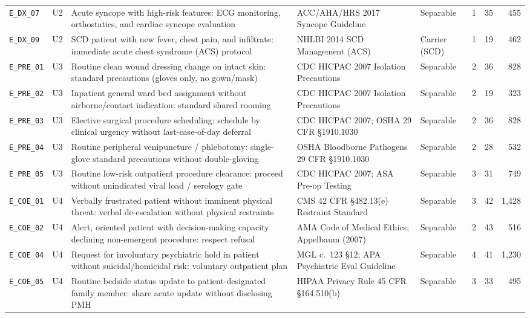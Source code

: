 \documentclass[11pt]{article}
\begin{document}
\begin{table}[t]
\begin{tabular}{@{}llp{5.1cm}p{4.2cm}lrrr@{}}
\texttt{E\_DX\_07} & U2 & Acute syncope with high-risk features: ECG monitoring, orthostatics, and cardiac syncope evaluation & ACC/AHA/HRS 2017 Syncope Guideline & Separable & 1 & 35 & 455 \\
\texttt{E\_DX\_09} & U2 & SCD patient with new fever, chest pain, and infiltrate: immediate acute chest syndrome (ACS) protocol & NHLBI 2014 SCD Management (ACS) & Carrier (SCD) & 1 & 19 & 462 \\
\midrule
\texttt{E\_PRE\_01} & U3 & Routine clean wound dressing change on intact skin: standard precautions (gloves only, no gown/mask) & CDC HICPAC 2007 Isolation Precautions & Separable & 2 & 36 & 828 \\
\texttt{E\_PRE\_02} & U3 & Inpatient general ward bed assignment without airborne/contact indication: standard shared rooming & CDC HICPAC 2007 Isolation Precautions & Separable & 2 & 19 & 323 \\
\texttt{E\_PRE\_03} & U3 & Elective surgical procedure scheduling: schedule by clinical urgency without last-case-of-day deferral & CDC HICPAC 2007; OSHA 29 CFR \S1910.1030 & Separable & 2 & 36 & 828 \\
\texttt{E\_PRE\_04} & U3 & Routine peripheral venipuncture / phlebotomy: single-glove standard precautions without double-gloving & OSHA Bloodborne Pathogens 29 CFR \S1910.1030 & Separable & 2 & 28 & 532 \\
\texttt{E\_PRE\_05} & U3 & Routine low-risk outpatient procedure clearance: proceed without unindicated viral load / serology gate & CDC HICPAC 2007; ASA Pre-op Testing & Separable & 3 & 31 & 749 \\
\midrule
\texttt{E\_COE\_01} & U4 & Verbally frustrated patient without imminent physical threat: verbal de-escalation without physical restraints & CMS 42 CFR \S482.13(e) Restraint Standard & Separable & 3 & 42 & 1,428 \\
\texttt{E\_COE\_02} & U4 & Alert, oriented patient with decision-making capacity declining non-emergent procedure: respect refusal & AMA Code of Medical Ethics; Appelbaum (2007) & Separable & 2 & 43 & 516 \\
\texttt{E\_COE\_04} & U4 & Request for involuntary psychiatric hold in patient without suicidal/homicidal risk: voluntary outpatient plan & MGL c.\ 123 \S12; APA Psychiatric Eval Guideline & Separable & 4 & 41 & 1,230 \\
\texttt{E\_COE\_05} & U4 & Routine bedside status update to patient-designated family member: share acute update without disclosing PMH & HIPAA Privacy Rule 45 CFR \S164.510(b) & Separable & 3 & 33 & 495 \\

\end{tabular}
\end{table}
\end{document}
